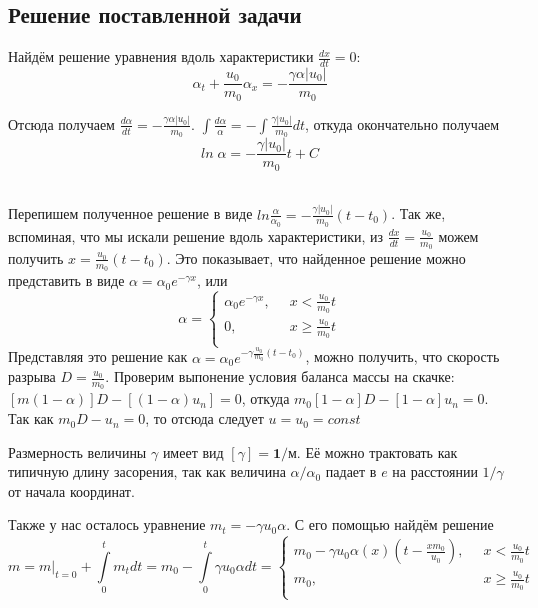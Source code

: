\documentclass[a4paper,12pt]{article}
\renewcommand{\d}{\displaystyle}
\begin{document}
\subsection{Решение поставленной задачи}
\par Найдём решение уравнения вдоль характеристики $\d \frac{dx}{dt}=0$: $$\d \alpha_{t}+\frac{u_{0}}{m_{0}}\alpha_{x}=-\frac{\gamma\alpha|u_{0}|}{m_{0}}$$ 
\par Отсюда получаем $\d \frac{d\alpha}{dt}=-\frac{\gamma\alpha|u_{0}|}{m_{0}}$. $\d \int\frac{d\alpha}{\alpha}=-\int\frac{\gamma|u_{0}|}{m_{0}}dt$, откуда окончательно получаем $$\d ln\;\alpha=-\frac{\gamma|u_{0}|}{m_{0}}t+C$$\\
\par Перепишем полученное решение в виде $\d ln\frac{\alpha}{\alpha_{0}}=-\frac{\gamma|u_{0}|}{m_{0}}(t-t_{0})$. Так же, вспоминая, что мы искали решение вдоль характеристики, из $\d \frac{dx}{dt}=\frac{u_{0}}{m_{0}}$ можем получить $\d x=\frac{u_{0}}{m_{0}}(t-t_{0})$. Это показывает, что найденное решение можно представить в виде $\alpha=\alpha_{0}e^{-\gamma x}$, или 
\begin{equation*}
\d
\alpha=
\begin{cases}
\d
\alpha_{0}e^{-\gamma x},\;\;& x<\frac{u_{0}}{m_{0}}t\\
0,\;\;& x\geq \frac{u_{0}}{m_{0}}t\\
\end{cases}
\end{equation*}
 Представляя это решение как $\d \alpha=\alpha_{0}e^{-\gamma \frac{u_{0}}{m_{0}}(t-t_{0})}$, можно получить, что скорость разрыва $\d D=\frac{u_{0}}{m_{0}}$. Проверим выпонение условия баланса массы на скачке: $[m(1-\alpha)]D-[(1-\alpha)u_{n}]=0$, откуда $m_{0}[1-\alpha]D-[1-\alpha]u_{n}=0$. Так как $m_{0}D-u_{n}=0$, то отсюда следует $u=u_{0}=const$\\
\par Размерность величины $\gamma$ имеет вид $[\gamma]=\textbf{1/м}$. Её можно трактовать как типичную длину засорения, так как величина $\alpha/\alpha_{0}$ падает в $e$ на расстоянии $1/\gamma$ от начала координат.\\
\par Также у нас осталось уравнение $m_{t}=-\gamma u_{0}\alpha$. С его помощью найдём решение 
\begin{equation*}
\d
m=m|_{t=0}+\int\limits^{t}_{0}m_{t}dt=m_{0}-\int\limits^{t}_{0}\gamma u_{0}\alpha dt=
\begin{cases}
\d
m_{0}-\gamma u_{0}\alpha(x)(t-\frac{xm_{0}}{u_{0}}),\;\;& x<\frac{u_{0}}{m_{0}}t\\
m_{0},\;\;& x\geq \frac{u_{0}}{m_{0}}t\\
\end{cases}
\end{equation*}
\pagebreak
\end{document}
